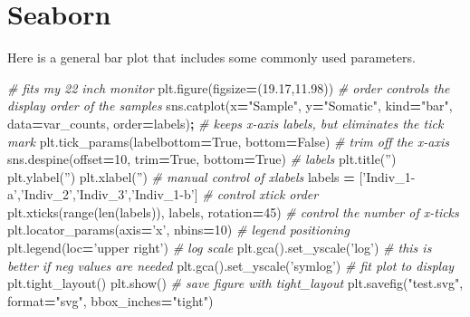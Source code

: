 \documentclass[]{book}
\newenvironment{Shaded}{\begin{snugshade}}{\end{snugshade}}
\newcommand{\DecValTok}[1]{\textcolor[rgb]{0.00,0.00,0.81}{#1}}
\newcommand{\FloatTok}[1]{\textcolor[rgb]{0.00,0.00,0.81}{#1}}
\newcommand{\StringTok}[1]{\textcolor[rgb]{0.31,0.60,0.02}{#1}}
\newcommand{\CommentTok}[1]{\textcolor[rgb]{0.56,0.35,0.01}{\textit{#1}}}
\newcommand{\VariableTok}[1]{\textcolor[rgb]{0.00,0.00,0.00}{#1}}
\newcommand{\OperatorTok}[1]{\textcolor[rgb]{0.81,0.36,0.00}{\textbf{#1}}}
\newcommand{\BuiltInTok}[1]{#1}
\newcommand{\NormalTok}[1]{#1}
\begin{document}
\section{Seaborn}\label{seaborn}

Here is a general bar plot that includes some commonly used parameters.

\begin{Shaded}
\begin{Highlighting}[]
\CommentTok{# fits my 22 inch monitor}
\NormalTok{plt.figure(figsize}\OperatorTok{=}\NormalTok{(}\FloatTok{19.17}\NormalTok{,}\FloatTok{11.98}\NormalTok{))}
\CommentTok{# order controls the display order of the samples}
\NormalTok{sns.catplot(x}\OperatorTok{=}\StringTok{"Sample"}\NormalTok{, y}\OperatorTok{=}\StringTok{"Somatic"}\NormalTok{, kind}\OperatorTok{=}\StringTok{"bar"}\NormalTok{, data}\OperatorTok{=}\NormalTok{var_counts, order}\OperatorTok{=}\NormalTok{labels)}\OperatorTok{;}
\CommentTok{# keeps x-axis labels, but eliminates the tick mark}
\NormalTok{plt.tick_params(labelbottom}\OperatorTok{=}\VariableTok{True}\NormalTok{, bottom}\OperatorTok{=}\VariableTok{False}\NormalTok{)}
\CommentTok{# trim off the x-axis}
\NormalTok{sns.despine(offset}\OperatorTok{=}\DecValTok{10}\NormalTok{, trim}\OperatorTok{=}\VariableTok{True}\NormalTok{, bottom}\OperatorTok{=}\VariableTok{True}\NormalTok{)}
\CommentTok{# labels}
\NormalTok{plt.title(}\StringTok{''}\NormalTok{)}
\NormalTok{plt.ylabel(}\StringTok{''}\NormalTok{)}
\NormalTok{plt.xlabel(}\StringTok{''}\NormalTok{)}
\CommentTok{# manual control of xlabels}
\NormalTok{labels }\OperatorTok{=}\NormalTok{ [}\StringTok{'Indiv_1-a'}\NormalTok{,}\StringTok{'Indiv_2'}\NormalTok{,}\StringTok{'Indiv_3'}\NormalTok{,}\StringTok{'Indiv_1-b'}\NormalTok{]}
\CommentTok{# control xtick order}
\NormalTok{plt.xticks(}\BuiltInTok{range}\NormalTok{(}\BuiltInTok{len}\NormalTok{(labels)), labels, rotation}\OperatorTok{=}\DecValTok{45}\NormalTok{)}
\CommentTok{# control the number of x-ticks}
\NormalTok{plt.locator_params(axis}\OperatorTok{=}\StringTok{'x'}\NormalTok{, nbins}\OperatorTok{=}\DecValTok{10}\NormalTok{)}
\CommentTok{# legend positioning}
\NormalTok{plt.legend(loc}\OperatorTok{=}\StringTok{'upper right'}\NormalTok{)}
\CommentTok{# log scale}
\NormalTok{plt.gca().set_yscale(}\StringTok{'log'}\NormalTok{)}
\CommentTok{# this is better if neg values are needed}
\NormalTok{plt.gca().set_yscale(}\StringTok{'symlog'}\NormalTok{)}
\CommentTok{# fit plot to display}
\NormalTok{plt.tight_layout()}
\NormalTok{plt.show()}
\CommentTok{# save figure with tight_layout}
\NormalTok{plt.savefig(}\StringTok{"test.svg"}\NormalTok{, }\BuiltInTok{format}\OperatorTok{=}\StringTok{"svg"}\NormalTok{, bbox_inches}\OperatorTok{=}\StringTok{"tight"}\NormalTok{)}
\end{Highlighting}
\end{Shaded}
\end{document}
